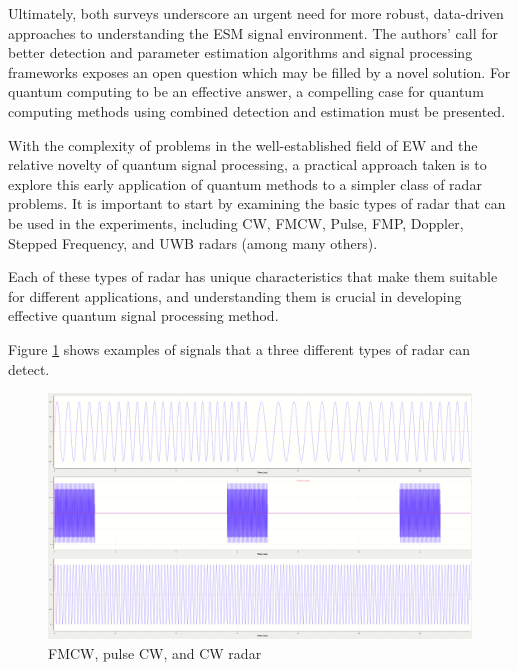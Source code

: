 Ultimately, both surveys underscore an urgent need for more robust, data-driven approaches to understanding the \ac{ESM} signal environment.
The authors' call for better detection and parameter estimation algorithms and signal processing frameworks exposes an open question which may be filled by a novel solution.
For quantum computing to be an effective answer, a compelling case for quantum computing methods using combined detection and estimation must be presented.

With the complexity of problems in the well-established field of \ac{EW} and the relative novelty of quantum signal processing, a practical approach taken is to explore this early application of quantum methods to a simpler class of radar problems.
It is important to start by examining the basic types of radar that can be used in the experiments, including \ac{CW}, \ac{FMCW}, Pulse, \ac{FMP}, Doppler, Stepped Frequency, and \ac{UWB} radars (among many others). 

Each of these types of radar has unique characteristics that make them suitable for different applications, and understanding them is crucial in developing effective quantum signal processing method.


Figure \ref{fig:radar_types} shows examples of signals that a three different types of radar can detect.

\begin{figure}[ht]
    \centering
    \includegraphics[width=1\textwidth]{Figures/radar_types.PNG}
    \caption{\ac{FMCW}, pulse \ac{CW}, and \ac{CW} radar}
    \label{fig:radar_types}
\end{figure}

